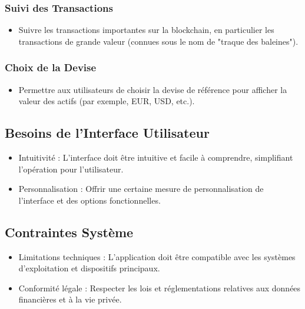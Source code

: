 \documentclass{article}
\begin{document}
\subsubsection{Suivi des Transactions}
\begin{itemize}
    \item Suivre les transactions importantes sur la blockchain, en particulier les transactions de grande valeur (connues sous le nom de "traque des baleines").
\end{itemize}

\subsubsection{Choix de la Devise}
\begin{itemize}
    \item Permettre aux utilisateurs de choisir la devise de référence pour afficher la valeur des actifs (par exemple, EUR, USD, etc.).
\end{itemize}

\subsection{Besoins de l'Interface Utilisateur}
\begin{itemize}
    \item Intuitivité : L'interface doit être intuitive et facile à comprendre, simplifiant l'opération pour l'utilisateur.
    \item Personnalisation : Offrir une certaine mesure de personnalisation de l'interface et des options fonctionnelles.
\end{itemize}

\subsection{Contraintes Système}
\begin{itemize}
    \item Limitations techniques : L'application doit être compatible avec les systèmes d'exploitation et dispositifs principaux.
    \item Conformité légale : Respecter les lois et réglementations relatives aux données financières et à la vie privée.
\end{itemize}
\end{document}
